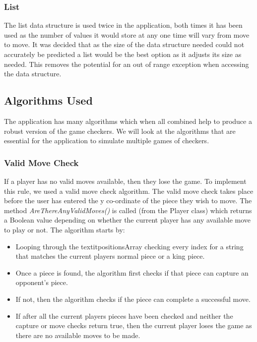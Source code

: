 \documentclass[10pt, a4paper]{article}
\begin{document}
      
  		\subsubsection{List}
  		The list data structure is used twice in the application, both times it has been used as the number of values it would store at any one time will vary from move to move. It was decided that as the size of the data structure needed could not accurately be predicted a list would be the best option as it adjusts its size as needed. This removes the potential for an out of range exception when accessing the data structure.
    
    
    
 	\subsection{Algorithms Used}
 	The application has many algorithms which when all combined help to produce a robust version of the game checkers. We will look at the algorithms that are essential for the application to simulate multiple games of checkers.
    
    	\subsubsection{Valid Move Check}
    	If a player has no valid moves available, then they lose the game. To implement this rule, we used a valid move check algorithm. The valid move check takes place before the user has entered the y co-ordinate of the piece they wish to move. The method \textit{AreThereAnyValidMoves()} is called (from the Player class) which returns a Boolean value depending on whether the current player has any available move to play or not.
    	\newline
    	The algorithm starts by:      
   
   		\begin{itemize}
   		\item Looping through the textit{positionsArray} checking every index for a string that matches the current players normal piece or a king piece.  
   		\item Once a piece is found, the algorithm first checks if that piece can capture an opponent's piece.
   		\item If not, then the algorithm checks if the piece can complete a successful move. 
		\item If after all the current players pieces have been checked and neither the capture or move checks return true, then the current player loses the game as there are no available moves to be made. 
   		\end{itemize}
   
\end{document}
